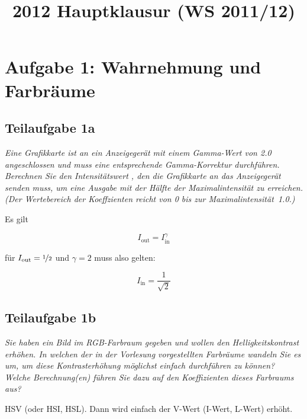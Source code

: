 \documentclass[a4paper]{scrartcl}
\begin{document}
\title{2012 Hauptklausur (WS 2011/12)}

\setcounter{section}{1}
\section*{Aufgabe 1: Wahrnehmung und Farbräume}
\subsection*{Teilaufgabe 1a}
\textit{Eine Grafikkarte ist an ein Anzeigegerät mit einem Gamma-Wert von 2.0
angeschlossen und muss eine entsprechende Gamma-Korrektur durchführen.
Berechnen Sie den Intensitätswert , den die Grafikkarte an das Anzeigegerät
senden muss, um eine Ausgabe mit der Hälfte der Maximalintensität zu erreichen.
(Der Wertebereich der Koeffzienten reicht von 0 bis zur
 Maximalintensität~1.0.)}

Es gilt

\[I_{\text{out}} = I_{\text{in}}^\gamma\]

für $I_{\text{out}} = \nicefrac{1}{2}$ und $\gamma = 2$ muss also gelten:

\[I_{\text{in}} = \frac{1}{\sqrt{2}}\]


\subsection*{Teilaufgabe 1b}
\textit{Sie haben ein Bild im RGB-Farbraum gegeben und wollen den Helligkeitskontrast erhöhen. In welchen der in der Vorlesung vorgestellten Farbräume wandeln Sie es um,
um diese Kontrasterhöhung möglichst einfach durchführen zu können? Welche Berechnung(en) führen Sie dazu auf den Koeffizienten dieses Farbraums aus?}

HSV (oder HSI, HSL). Dann wird einfach der V-Wert (I-Wert, L-Wert) erhöht.
\end{document}
